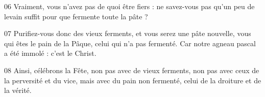 
06 Vraiment, vous n’avez pas de quoi être fiers : ne savez-vous pas qu’un peu de levain suffit pour que fermente toute la pâte ?

07 Purifiez-vous donc des vieux ferments, et vous serez une pâte nouvelle, vous qui êtes le pain de la Pâque, celui qui n’a pas fermenté. Car notre agneau pascal a été immolé : c’est le Christ.

08 Ainsi, célébrons la Fête, non pas avec de vieux ferments, non pas avec ceux de la perversité et du vice, mais avec du pain non fermenté, celui de la droiture et de la vérité.
